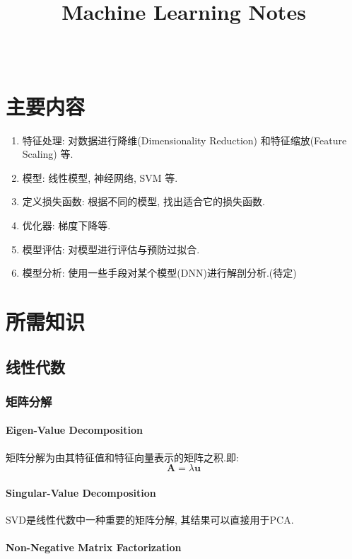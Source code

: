 \documentclass[oneside]{book}
\title{\titlteFont Machine Learning Notes}
\author{\authorFont{Jiang Tao}\\ \NovaMonoFont{vix2018@gmail.com}}
\date{\NovaMonoFont 2019}
\begin{document}
	\begin{titlepage}
		\maketitle
	\end{titlepage}
	\tableofcontents
	\setcounter{chapter}{0}
	\renewcommand{\thechapter}{\roman{chapter}}
	\chapter{主要内容}
			\begin{enumerate} 
				\item 特征处理: 对数据进行降维(Dimensionality Reduction) 和特征缩放(Feature Scaling) 等.
				\item 模型: 线性模型, 神经网络, SVM 等.
				\item 定义损失函数: 根据不同的模型, 找出适合它的损失函数.
				\item 优化器: 梯度下降等.
				\item 模型评估: 对模型进行评估与预防过拟合.
				\item 模型分析: 使用一些手段对某个模型(DNN)进行解剖分析.(待定)
			\end{enumerate}
	\chapter{所需知识}
		\section{线性代数}
			\subsection{矩阵分解}
				\subsubsection{Eigen-Value Decomposition}
					矩阵分解为由其特征值和特征向量表示的矩阵之积.即:
					$$\boldsymbol{A} = \lambda \boldsymbol{u}$$
				\subsubsection{Singular-Value Decomposition}
					SVD是线性代数中一种重要的矩阵分解, 其结果可以直接用于PCA.	
				\subsubsection{Non-Negative Matrix Factorization}	
\end{document}
